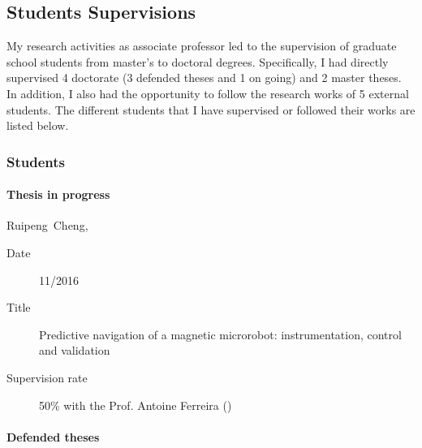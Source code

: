 \SkipAndBreak

\subsection{Students Supervisions}\label{sec:CV:supervision}
My research activities as associate professor led to the supervision of graduate school students from master's to doctoral degrees.
Specifically, I had directly supervised 4 doctorate (3 defended theses and 1 on going) and 2 master theses.
In addition, I also had the opportunity to follow the research works of 5 external \PhD students.
The different students that  I have supervised or followed their works are listed below.


\subsubsection[PhD Students]{\PhD Students}\label{sec:CV:PhD}

\paragraph{Thesis in progress}\label{sec:CV:PhD:continue}

\begin{CVlist}[label={[SUP\arabic*]}]
  \item{}\textsf{Ruipeng~Cheng}, 
  \begin{description}
    \item[Date] 11/2016 
    \item[Title] Predictive navigation of a magnetic microrobot:    instrumentation, control and validation
    \item[Supervision rate]  50\% with the Prof. Antoine Ferreira (\INSA \CVL) %
  \end{description}
  \SaveOrder
\end{CVlist}

\paragraph{Defended theses}\label{sec:CV:PhD:defended}

